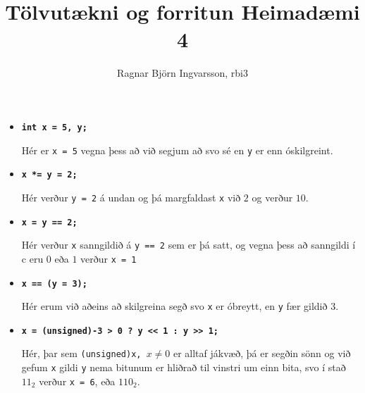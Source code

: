 \documentclass{article}
\title{Tölvutækni og forritun Heimadæmi 4}
\author{Ragnar Björn Ingvarsson, rbi3}
\begin{document}
\renewcommand\thepage{}
	
	\maketitle

	\newpage
	\setcounter{page}{1}
	\renewcommand\thepage{\arabic{page}}

	\section{}

	\begin{itemize}
		\item[] \textbf{\texttt{int x = 5, y;}}

			Hér er \texttt{x = 5} vegna þess að við segjum að svo sé en 
			\texttt{y} er enn óskilgreint.
		\item[] \textbf{\texttt{x *= y = 2;}}

			Hér verður \texttt{y = 2} á undan og þá margfaldast \texttt{x} 
			við $2$ og verður $10$.
		\item[] \textbf{\texttt{x = y == 2;}}

			Hér verður \texttt{x} sanngildið á \texttt{y == 2} sem er þá 
			satt, og vegna þess að sanngildi í c eru $0$ eða $1$ verður 
			\texttt{x = 1}
		\item[] \textbf{\texttt{x == (y = 3);}}

			Hér erum við aðeins að skilgreina segð svo \texttt{x} er 
			óbreytt, en \texttt{y} fær gildið $3$.
		\item[] \textbf{\texttt{x = (unsigned)-3 > 0 ? y <{}< 1 : y >{}> 1;}}

			Hér, þar sem \texttt{(unsigned)x, $x \neq 0$} er alltaf jákvæð, þá er segðin 
			sönn og við gefum \texttt{x} gildi \texttt{y} nema bitunum 
			er hliðrað til vinstri um einn bita, svo í stað $11_2$ verður 
			\texttt{x = 6}, eða $110_2$.
	\end{itemize}

	\section{}
\end{document}

